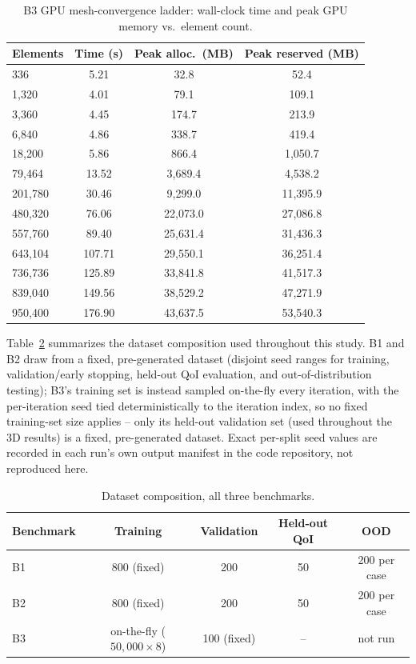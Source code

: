 \documentclass[final,5p,times]{elsarticle}
\begin{document}
\begin{table}[ht]
\centering
\caption{B3 GPU mesh-convergence ladder: wall-clock time
  and peak GPU memory vs.\ element count.}
\label{tab:b3-ladder-time}
\small
\begin{tabular}{lccc}
\toprule
Elements & Time (s) & Peak alloc.\ (MB) & Peak reserved (MB) \\
\midrule
336      & 5.21   & 32.8    & 52.4 \\
1{,}320    & 4.01   & 79.1    & 109.1 \\
3{,}360    & 4.45   & 174.7   & 213.9 \\
6{,}840    & 4.86   & 338.7   & 419.4 \\
18{,}200   & 5.86   & 866.4   & 1{,}050.7 \\
79{,}464   & 13.52  & 3{,}689.4 & 4{,}538.2 \\
201{,}780  & 30.46  & 9{,}299.0 & 11{,}395.9 \\
480{,}320  & 76.06  & 22{,}073.0 & 27{,}086.8 \\
557{,}760  & 89.40  & 25{,}631.4 & 31{,}436.3 \\
643{,}104  & 107.71 & 29{,}550.1 & 36{,}251.4 \\
736{,}736  & 125.89 & 33{,}841.8 & 41{,}517.3 \\
839{,}040  & 149.56 & 38{,}529.2 & 47{,}271.9 \\
950{,}400  & 176.90 & 43{,}637.5 & 53{,}540.3 \\
\bottomrule
\end{tabular}
\end{table}

Table~\ref{tab:dataset-composition} summarizes the dataset composition
used throughout this study. B1 and B2 draw from a fixed, pre-generated
dataset (disjoint seed ranges for training, validation/early stopping,
held-out QoI evaluation, and out-of-distribution testing); B3's training set is instead sampled
on-the-fly every iteration, with the per-iteration seed tied
deterministically to the iteration index, so no fixed training-set size
applies -- only its held-out validation set (used throughout the 3D
results) is a fixed, pre-generated dataset. Exact per-split seed values
are recorded in each run's own output manifest in the code repository,
not reproduced here.

\begin{table}[h]
\centering
\caption{Dataset composition, all three benchmarks.}
\label{tab:dataset-composition}
\footnotesize
\begin{tabular}{lcccc}
\toprule
Benchmark & Training & Validation & Held-out QoI & OOD \\
\midrule
B1 & 800 (fixed) & 200 & 50 & 200 per case \\
B2 & 800 (fixed) & 200 & 50 & 200 per case \\
B3 & on-the-fly ($50{,}000\times8$) & 100 (fixed) & -- & not run \\
\bottomrule
\end{tabular}
\end{table}
\end{document}
